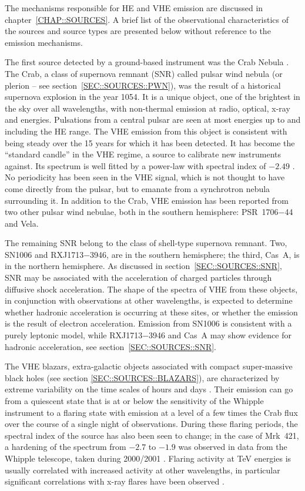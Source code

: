 The mechanisms responsible for HE and VHE emission are discussed in
chapter~\ref{CHAP::SOURCES}. A brief list of the observational
characteristics of the sources and source types are presented below
without reference to the emission mechanisms.  

The first source detected by a ground-based \Gray instrument was the
Crab Nebula \citep{REF::WEEKES::APJ1989}. The Crab, a class of
supernova remnant (SNR) called pulsar wind nebula (or plerion -- see
section~\ref{SEC::SOURCES::PWN}), was the result of a historical
supernova explosion in the year 1054. It is a unique object, one of
the brightest in the sky over all wavelengths, with non-thermal
emission at radio, optical, x-ray and \Gray energies. Pulsations from
a central pulsar are seen at most energies up to and including the HE
\Gray range. The VHE emission from this object is consistent with
being steady over the 15 years for which it has been detected. It has
become the ``standard candle'' in the VHE regime, a source to
calibrate new instruments against. Its spectrum is well fitted by a
power-law with spectral index of $-2.49$ \citep{REF::HILLAS::1998}. No
periodicity has been seen in the VHE \Gray signal, which is not
thought to have come directly from the pulsar, but to emanate from a
synchrotron nebula surrounding it. In addition to the Crab, VHE
emission has been reported from two other pulsar wind nebulae, both in
the southern hemisphere: PSR~1706$-$44 and Vela.

The remaining SNR belong to the class of shell-type supernova
remnant. Two, SN1006 and RXJ1713$-$3946, are in the southern
hemisphere; the third, Cas~A, is in the northern hemisphere.  As
discussed in section~\ref{SEC::SOURCES::SNR}, SNR may be associated
with the acceleration of charged particles through diffusive shock
acceleration. The shape of the spectra of VHE \Grays from these
objects, in conjunction with observations at other wavelengths, is
expected to determine whether hadronic acceleration is occurring at
these sites, or whether the emission is the result of electron
acceleration. Emission from SN1006 is consistent with a purely
leptonic model, while RXJ1713$-$3946 and Cas~A may show evidence for
hadronic acceleration, see section~\ref{SEC::SOURCES::SNR}.

The VHE blazars, extra-galactic objects associated with compact
super-massive black holes (see section \ref{SEC::SOURCES::BLAZARS}),
are characterized by extreme variability on the time scales of hours
and days \citep{REF::GAIDOS::NATURE1996}. Their emission can go from a
quiescent state that is at or below the sensitivity of the Whipple
instrument to a flaring state with emission at a level of a few times
the Crab flux over the course of a single night of
observations. During these flaring periods, the spectral index of the
source has also been seen to change; in the case of Mrk~421, a
hardening of the spectrum from $-2.7$ to $-1.9$ was observed in
data from the Whipple telescope, taken during 2000/2001
\citep{REF::KRENNRICH::APJ2002}. Flaring activity at TeV energies 
is usually correlated with increased activity at other wavelengths, in
particular significant correlations with x-ray flares have been
observed \citep{REF::MARASCHI::AP1999}.

